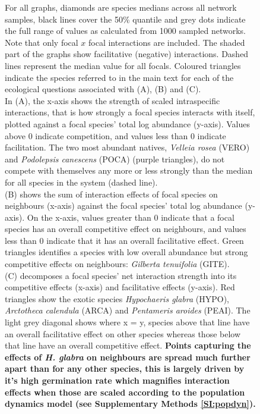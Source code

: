 \documentclass[a4,12pt]{article}
\begin{document}
    \addtocounter{figure}{-1}
    \begin{figure} [t!]
        \caption{For all graphs, diamonds are species medians across all network samples, black lines cover the 50\% quantile and grey dots indicate the full range of values as calculated from 1000 sampled networks. Note that only focal $x$ focal interactions are included. The shaded part of the graphs show facilitative (negative) interactions. Dashed lines represent the median value for all focals. Coloured triangles indicate the species referred to in the main text for each of the ecological questions associated with (A), (B) and (C). \\
        In (A), the x-axis shows the strength of scaled intraspecific interactions, that is how strongly a focal species interacts with itself, plotted against a focal species' total log abundance (y-axis). Values above $0$ indicate competition, and values less than $0$ indicate facilitation.  The two most abundant natives, \textit{Velleia rosea} (VERO) and \textit{Podolepsis canescens} (POCA) (purple triangles), do not compete with themselves any more or less strongly than the median for all species in the system (dashed line). \\
        (B) shows the sum of interaction effects of focal species on neighbours (x-axis) against the focal species' total log abundance (y-axis). On the x-axis, values greater than $0$ indicate that a focal species has an overall competitive effect on neighbours, and values less than $0$ indicate that it has an overall facilitative effect. Green triangles identifies a species with low overall abundance but strong competitive effects on neighbours: \textit{Gilberta tenuifolia} (GITE). \\
        (C) decomposes a focal species' net interaction strength into its competitive effects (x-axis) and facilitative effects (y-axis). Red triangles show the exotic species \textit{Hypochaeris glabra} (HYPO), \textit{Arctotheca calendula} (ARCA) and \textit{Pentameris aroides} (PEAI). The light grey diagonal shows where x = y, species above that line have an overall facilitative effect on other species whereas those below that line have an overall competitive effect. \textbf{Points capturing the effects of \textit{H. glabra} on neighbours are spread much further apart than for any other species, this is largely driven by it's high germination rate which magnifies interaction effects when those are scaled according to the population dynamics model (see Supplementary Methods \ref{SI:popdyn}).}} 
    \end{figure}

\clearpage
\newpage



\end{document}
